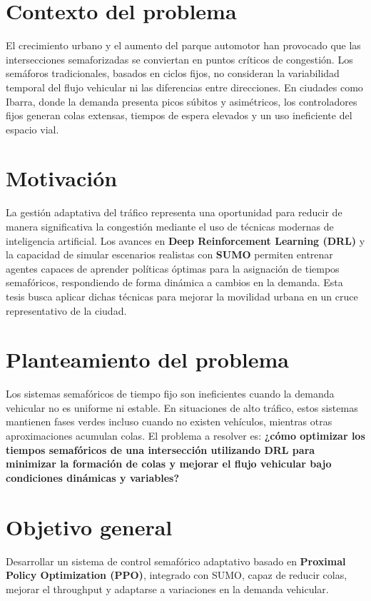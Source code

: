 \documentclass[12pt, a4paper]{report}
\begin{document}
\section*{Contexto del problema}
El crecimiento urbano y el aumento del parque automotor han provocado que las intersecciones semaforizadas se conviertan en puntos críticos de congestión. Los semáforos tradicionales, basados en ciclos fijos, no consideran la variabilidad temporal del flujo vehicular ni las diferencias entre direcciones. En ciudades como Ibarra, donde la demanda presenta picos súbitos y asimétricos, los controladores fijos generan colas extensas, tiempos de espera elevados y un uso ineficiente del espacio vial.

\section*{Motivación}
La gestión adaptativa del tráfico representa una oportunidad para reducir de manera significativa la congestión mediante el uso de técnicas modernas de inteligencia artificial. Los avances en \textbf{Deep Reinforcement Learning (DRL)} y la capacidad de simular escenarios realistas con \textbf{SUMO} permiten entrenar agentes capaces de aprender políticas óptimas para la asignación de tiempos semafóricos, respondiendo de forma dinámica a cambios en la demanda. Esta tesis busca aplicar dichas técnicas para mejorar la movilidad urbana en un cruce representativo de la ciudad.

\section*{Planteamiento del problema}
Los sistemas semafóricos de tiempo fijo son ineficientes cuando la demanda vehicular no es uniforme ni estable. En situaciones de alto tráfico, estos sistemas mantienen fases verdes incluso cuando no existen vehículos, mientras otras aproximaciones acumulan colas. El problema a resolver es: \textbf{¿cómo optimizar los tiempos semafóricos de una intersección utilizando DRL para minimizar la formación de colas y mejorar el flujo vehicular bajo condiciones dinámicas y variables?}

\section*{Objetivo general}
Desarrollar un sistema de control semafórico adaptativo basado en \textbf{Proximal Policy Optimization (PPO)}, integrado con SUMO, capaz de reducir colas, mejorar el throughput y adaptarse a variaciones en la demanda vehicular.
\end{document}
